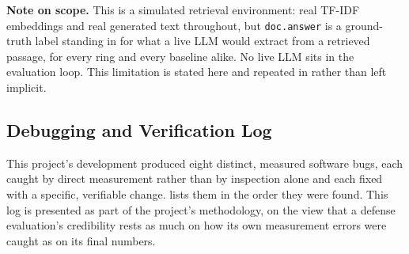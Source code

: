 \textbf{Note on scope.} This is a simulated retrieval environment: real
TF-IDF embeddings and real generated text throughout, but
\texttt{doc.answer} is a ground-truth label standing in for what a live
LLM would extract from a retrieved passage, for every ring and every
baseline alike. No live LLM sits in the evaluation loop. This limitation
is stated here and repeated in  rather than left
implicit.

\subsection{Debugging and Verification Log}
\label{sec:debugging}

This project's development produced eight distinct, measured software
bugs, each caught by direct measurement rather than by inspection alone
and each fixed with a specific, verifiable change. 
lists them in the order they were found. This log is presented as part of
the project's methodology, on the view that a defense evaluation's
credibility rests as much on how its own measurement errors were caught
as on its final numbers.


